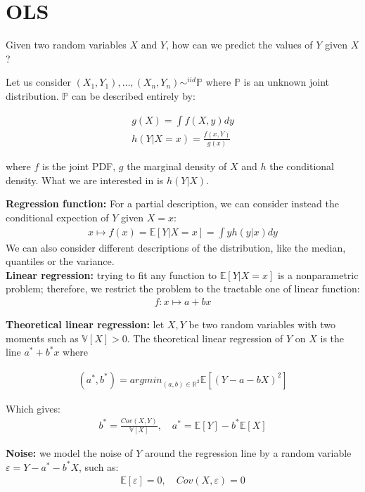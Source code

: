 \section{OLS}

Given two random variables $X$ and $Y$, how can we predict the values of $Y$ given $X$?

Let us consider $(X_1, Y_1), \ldots, (X_n, Y_n) \sim^{iid } \mathbb{P}$ where $\mathbb{P}$ is an unknown joint distribution. $\mathbb{P}$ can be described entirely by:

\begin{align*}
g(X) = \int f(X, y)dy\\
h(Y|X=x) = \frac{f(x, Y)}{g(x)}
\end{align*}

where $f$ is the joint PDF, $g$ the marginal density of $X$ and $h$ the conditional density. What we are interested in is $h(Y|X)$.

\textbf{Regression function:} For a partial description, we can consider instead the conditional expection of $Y$ given $X=x$:
\begin{align*}
x \mapsto f(x) = \mathbb{E}[Y | X=x] = \int yh(y|x)dy
\end{align*}
We can also consider different descriptions of the distribution, like the median, quantiles or the variance.\\
\textbf{Linear regression:} trying to fit any function to $\mathbb{E}[Y | X=x]$ is a nonparametric problem; therefore, we restrict the problem to the tractable one of linear function:
\begin{align*}
f: x \mapsto a + bx
\end{align*}

\textbf{Theoretical linear regression:} let $X, Y$ be two random variables with two moments such as $\mathbb{V}[X] > 0$. The theoretical linear regression of $Y$ on $X$ is the line $a^{*} + b^{*}x$ where

\begin{align*}
(a^{*}, b^{*}) = argmin_{(a, b) \in \mathbb{R}^2}\mathbb{E}\left[(Y - a - bX)^2\right]
\end{align*}

Which gives:
\begin{align*}
b^{*} = \frac{Cov(X, Y)}{\mathbb{V}[X]}, \quad a^{*} = \mathbb{E}[Y] - b^{*} \mathbb{E}[X]
\end{align*}

\textbf{Noise:} we model the noise of $Y$ around the regression line by a random variable $\varepsilon = Y - a^{*} - b^{*} X$, such as:
\begin{align*}
\mathbb{E}[\varepsilon] = 0, \quad Cov(X, \varepsilon) = 0
\end{align*}

